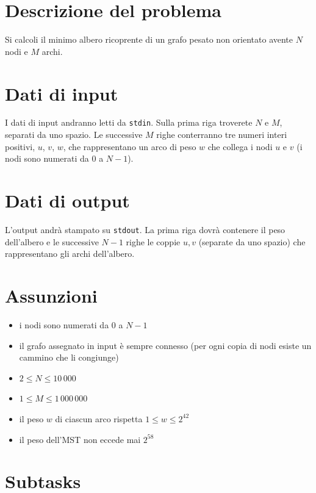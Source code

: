 \documentclass[a4paper,11pt]{article}
\begin{document}


\section*{Descrizione del problema}
  
    Si calcoli il minimo albero ricoprente di un grafo pesato non
    orientato avente $N$ nodi e $M$ archi.
  

\section*{Dati di input}
  
    I dati di input andranno letti da \texttt{stdin}. Sulla prima riga troverete $N$
    e $M$, separati da uno spazio. Le successive $M$
    righe conterranno tre numeri interi
    positivi, $u$, $v$, $w$, che
    rappresentano un arco di peso $w$ che collega i
    nodi $u$ e $v$ (i nodi sono numerati da $0$ a $N-1$).
  

\section*{Dati di output}
  
    L'output andrà stampato su \texttt{stdout}. La prima riga dovrà contenere il peso dell'albero e
    le successive $N-1$ righe le coppie $u,v$
    (separate da uno spazio) che rappresentano gli archi dell'albero.
  
  \section*{Assunzioni}
  \begin{itemize}
    \item i nodi sono numerati da $0$ a $N-1$
    \item il grafo assegnato in input è sempre connesso (per ogni copia di nodi esiste un cammino che li congiunge)
    \item $2 ≤ N ≤ 10\,000$
    \item $1 ≤ M ≤ 1\,000\,000$
    \item il peso $w$ di ciascun arco rispetta $1 ≤ w ≤ 2^{42}$ 
    \item il peso dell'MST non eccede mai $2^{58}$
  \end{itemize}

\section*{Subtasks}
\end{document}
